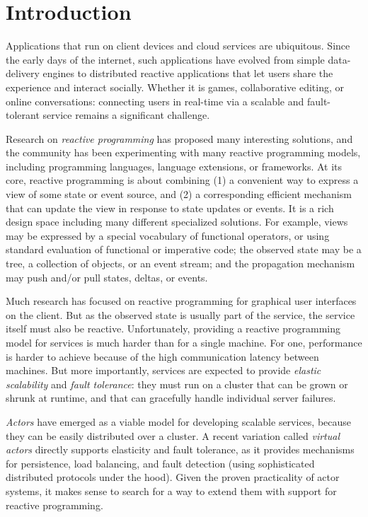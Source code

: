 \section{Introduction}

Applications that run on client devices and cloud services are ubiquitous. Since the early days of the internet, such applications have evolved from simple data-delivery engines to distributed reactive applications that let users share the experience and interact socially. Whether it is games, collaborative editing, or online conversations: connecting users in real-time via a scalable and fault-tolerant service remains a significant challenge.

Research on \emph{reactive programming} has proposed many interesting solutions, and the community has been experimenting with many reactive programming models, including programming languages, language extensions, or frameworks. At its core, reactive programming is about combining (1) a convenient way to express a view of some state or event source, and (2) a corresponding efficient mechanism that can update the view in response to state updates or events. It is a rich design space including many different specialized solutions. For example, views may be expressed by  a special vocabulary of functional operators, or using standard evaluation of functional or imperative code; the observed state may be  a tree, a collection of objects, or an event stream; and the propagation mechanism may push and/or pull states, deltas, or events.

Much research has focused on reactive programming for graphical user interfaces \cite{} on the client. But as the observed state is usually part of the service, the service itself must also be reactive. Unfortunately, providing a reactive programming model for services is much harder than for a single machine. For one, performance is harder to achieve because of the high communication latency between machines. But more importantly, services are expected to provide \emph{elastic scalability} and \emph{fault tolerance}: they must run on a cluster that can be grown or shrunk at runtime, and that can gracefully handle individual server failures. 

 \emph{Actors} have emerged as a viable model for developing scalable services, because they can be easily distributed over a cluster. A recent variation called \emph{virtual actors} directly supports elasticity and fault tolerance, as it provides mechanisms for persistence, load balancing, and fault detection (using sophisticated distributed protocols under the hood). Given the proven practicality of actor systems, it makes sense to search for a way to extend them with support for reactive programming.  
 
